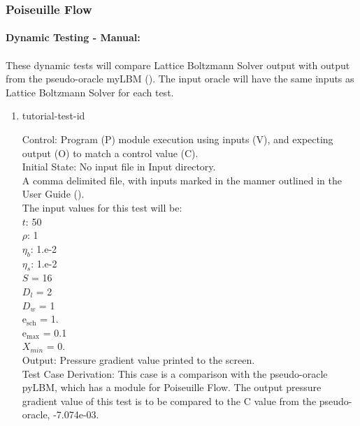 \documentclass[12pt, titlepage]{article}
\newcommand{\famname}{Lattice Boltzmann Solver}
\newcounter{testcounter} %
\begin{document}
\subsubsection{Poiseuille Flow}
\label{frpf}

\paragraph{Dynamic Testing - Manual:}
\paragraph{} These dynamic tests will compare {\famname} output with output from
the pseudo-oracle myLBM (\citet{pylbmcode}). The input oracle will have the same
inputs as {\famname} for each test.

\begin{enumerate}

\item{tutorial-test-id\thetestcounter \\}

Control: Program (P) module execution using inputs (V), and expecting output (O) to match a control value (C).\\
					
Initial State: No input file in Input directory.\\
					
A comma delimited file, with inputs marked in the manner outlined in the User
Guide (\citet{LBM_UserGuide_PM}).\\The input values for this test will be:\\
$t$: 50\\
$\rho$: 1\\
$\eta_b$: 1.e-2\\
$\eta_s$: 1.e-2\\
$S$ = 16\\
$D_{l}$ = 2\\
$D_{w}$ = 1\\
$\mathrm{e_{sch}}$ = 1.\\
$\mathrm{e_{max}}$ = 0.1\\
$X_{min}$ = 0.\\

					
Output: Pressure gradient value printed to the screen.  \\

Test Case Derivation: This case is a comparison with the pseudo-oracle pyLBM,
which has a module for Poiseuille Flow. The output pressure gradient value of
this test is to be compared to the C value from the pseudo-oracle,
-7.074e-03.\\
					

\end{enumerate}
\end{document}
